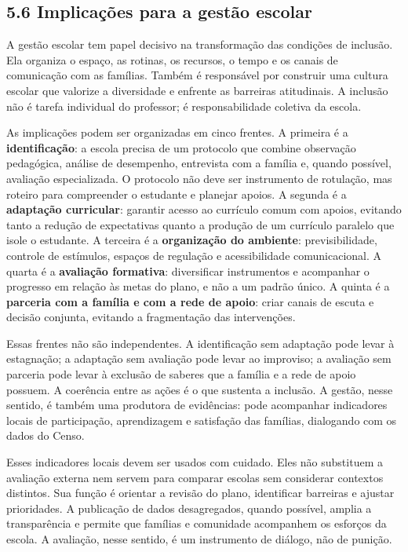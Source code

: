 \subsection{5.6 Implicações para a gestão
escolar}\label{implicauxe7uxf5es-para-a-gestuxe3o-escolar}

A gestão escolar tem papel decisivo na transformação das condições de
inclusão. Ela organiza o espaço, as rotinas, os recursos, o tempo e os
canais de comunicação com as famílias. Também é responsável por
construir uma cultura escolar que valorize a diversidade e enfrente as
barreiras atitudinais. A inclusão não é tarefa individual do professor;
é responsabilidade coletiva da escola.

As implicações podem ser organizadas em cinco frentes. A primeira é a
\textbf{identificação}: a escola precisa de um protocolo que combine
observação pedagógica, análise de desempenho, entrevista com a família
e, quando possível, avaliação especializada. O protocolo não deve ser
instrumento de rotulação, mas roteiro para compreender o estudante e
planejar apoios. A segunda é a \textbf{adaptação curricular}: garantir
acesso ao currículo comum com apoios, evitando tanto a redução de
expectativas quanto a produção de um currículo paralelo que isole o
estudante. A terceira é a \textbf{organização do ambiente}:
previsibilidade, controle de estímulos, espaços de regulação e
acessibilidade comunicacional. A quarta é a \textbf{avaliação
formativa}: diversificar instrumentos e acompanhar o progresso em
relação às metas do plano, e não a um padrão único. A quinta é a
\textbf{parceria com a família e com a rede de apoio}: criar canais de
escuta e decisão conjunta, evitando a fragmentação das intervenções.

Essas frentes não são independentes. A identificação sem adaptação pode
levar à estagnação; a adaptação sem avaliação pode levar ao improviso; a
avaliação sem parceria pode levar à exclusão de saberes que a família e
a rede de apoio possuem. A coerência entre as ações é o que sustenta a
inclusão. A gestão, nesse sentido, é também uma produtora de evidências:
pode acompanhar indicadores locais de participação, aprendizagem e
satisfação das famílias, dialogando com os dados do Censo.

Esses indicadores locais devem ser usados com cuidado. Eles não
substituem a avaliação externa nem servem para comparar escolas sem
considerar contextos distintos. Sua função é orientar a revisão do
plano, identificar barreiras e ajustar prioridades. A publicação de
dados desagregados, quando possível, amplia a transparência e permite
que famílias e comunidade acompanhem os esforços da escola. A avaliação,
nesse sentido, é um instrumento de diálogo, não de punição.

